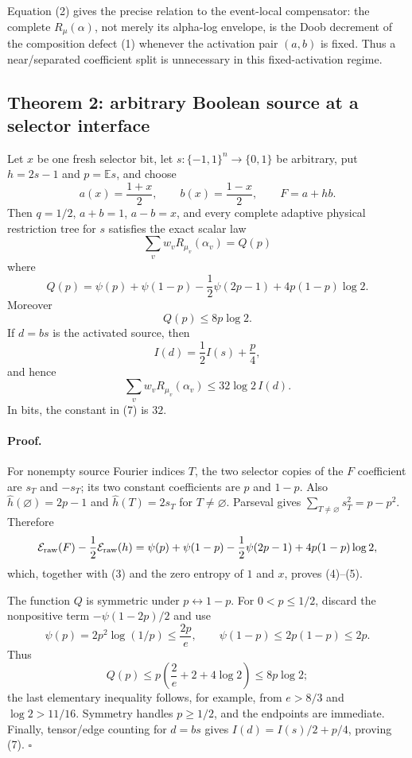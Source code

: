 Equation (2) gives the precise relation to the event-local compensator:
the complete $R_\mu(\alpha)$, not merely its alpha-log envelope, is the
Doob decrement of the composition defect (1) whenever the activation pair
$(a,b)$ is fixed.  Thus a near/separated coefficient split is unnecessary
in this fixed-activation regime.

\subsection*{Theorem 2: arbitrary Boolean source at a selector interface}

Let $x$ be one fresh selector bit, let $s:\{-1,1\}^n\to\{0,1\}$ be
arbitrary, put $h=2s-1$ and $p=\mathbb Es$, and choose
\[
 a(x)=\frac{1+x}{2},\qquad b(x)=\frac{1-x}{2},\qquad
 F=a+hb.
\]
Then $q=1/2$, $a+b=1$, $a-b=x$, and every complete adaptive physical
restriction tree for $s$ satisfies the exact scalar law
\[
 \boxed{\sum_vw_vR_{\mu_v}(\alpha_v)=Q(p)}                         \tag{4}
\]
where
\[
 Q(p)=\psi(p)+\psi(1-p)-\frac12\psi(2p-1)
       +4p(1-p)\log2.                                             \tag{5}
\]
Moreover
\[
 Q(p)\le8p\log2.                                                  \tag{6}
\]
If $d=bs$ is the activated source, then
\[
 I(d)=\frac12I(s)+\frac p4,
\]
and hence
\[
 \boxed{\sum_vw_vR_{\mu_v}(\alpha_v)
       \le32\log2\,I(d).}                                        \tag{7}
\]
In bits, the constant in (7) is $32$.

\paragraph{Proof.}
For nonempty source Fourier indices $T$, the two selector copies of the
$F$ coefficient are $s_T$ and $-s_T$; its two constant coefficients are
$p$ and $1-p$.  Also $\widehat h(\varnothing)=2p-1$ and
$\widehat h(T)=2s_T$ for $T\ne\varnothing$.  Parseval gives
$\sum_{T\ne\varnothing}s_T^2=p-p^2$.  Therefore
\begin{align*}
 \mathcal E_{\rm raw}(F)-\frac12\mathcal E_{\rm raw}(h)
  =\psi(p)+\psi(1-p)-\frac12\psi(2p-1)
   +4p(1-p)\log2,
\end{align*}
which, together with (3) and the zero entropy of $1$ and $x$, proves
(4)--(5).

The function $Q$ is symmetric under $p\leftrightarrow1-p$.  For
$0<p\le1/2$, discard the nonpositive term $-\psi(1-2p)/2$ and use
\[
 \psi(p)=2p^2\log(1/p)\le\frac{2p}{e},\qquad
 \psi(1-p)\le2p(1-p)\le2p.
\]
Thus
\[
 Q(p)\le p\left(\frac2e+2+4\log2\right)\le8p\log2;
\]
the last elementary inequality follows, for example, from
$e>8/3$ and $\log2>11/16$.  Symmetry handles $p\ge1/2$, and the endpoints
are immediate.  Finally, tensor/edge counting for $d=bs$ gives
$I(d)=I(s)/2+p/4$, proving (7). \(\square\)

